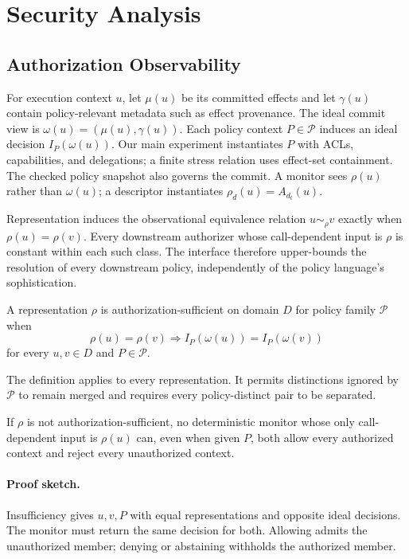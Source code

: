 \section{Security Analysis}
\label{sec:security-analysis}

\subsection{Authorization Observability}

For execution context $u$, let $\mu(u)$ be its committed effects and let
$\gamma(u)$ contain policy-relevant metadata such as effect provenance.  The
ideal commit view is $\omega(u)=(\mu(u),\gamma(u))$.  Each policy context
$P\in\mathcal P$ induces an ideal decision $I_P(\omega(u))$.  Our main
experiment instantiates $P$ with ACLs, capabilities, and delegations; a finite
stress relation uses effect-set containment. The checked policy snapshot also
governs the commit. A monitor
sees $\rho(u)$ rather than $\omega(u)$; a descriptor instantiates
$\rho_d(u)=A_{d_t}(u)$.

Representation induces the observational equivalence relation
$u\sim_\rho v$ exactly when $\rho(u)=\rho(v)$.  Every downstream authorizer
whose call-dependent input is $\rho$ is constant within each such class.  The
interface therefore upper-bounds the resolution of every downstream policy,
independently of the policy language's sophistication.

\begin{definition}
\label{def:authorization-equivalence}
A representation $\rho$ is authorization-sufficient on domain $D$ for policy
family $\mathcal P$ when
\[
 \rho(u)=\rho(v) \Longrightarrow
 I_P(\omega(u))=I_P(\omega(v))
\]
for every $u,v\in D$ and $P\in\mathcal P$.
\end{definition}

The definition applies to every representation. It permits distinctions ignored
by $\mathcal P$ to remain merged and requires every policy-distinct pair to be
separated.

\begin{theorem}
\label{thm:representation-insufficiency}
If $\rho$ is not authorization-sufficient, no deterministic monitor whose only
call-dependent input is $\rho(u)$ can, even when given $P$, both allow every
authorized context and reject every unauthorized context.
\end{theorem}

\paragraph{Proof sketch.}
Insufficiency gives $u,v,P$ with equal representations and opposite ideal
decisions.  The monitor must return the same decision for both.  Allowing
admits the unauthorized member; denying or abstaining withholds the authorized
member.

